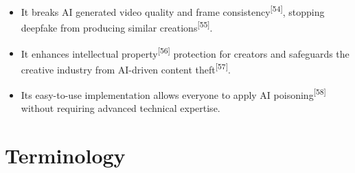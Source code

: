 \begin{itemize}
    \item It breaks AI generated video quality and frame consistency\textsuperscript{[54]}, stopping deepfake from producing similar creations\textsuperscript{[55]}. 
    \item It enhances intellectual property\textsuperscript{[56]} protection for creators and safeguards the creative industry from AI-driven content theft\textsuperscript{[57]}.
    \item Its easy-to-use implementation allows everyone to apply AI poisoning\textsuperscript{[58]} without requiring advanced technical expertise.
\end{itemize}

\section{Terminology}
\label{section:terminology}

